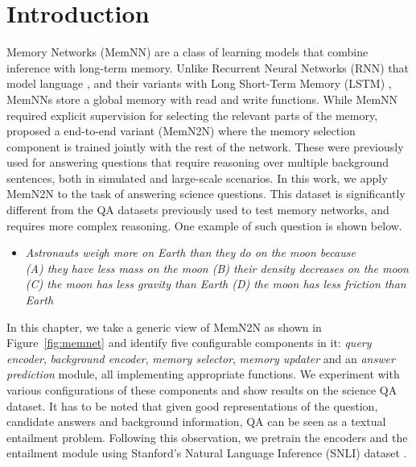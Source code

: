 \section{Introduction}
Memory Networks (MemNN) \citep{weston2014memory} are a class of learning models
that combine inference with long-term memory. Unlike Recurrent Neural Networks
(RNN) that model language \citep{mikolov2010recurrent}, and their variants with
Long Short-Term Memory (LSTM) \citep{hochreiter1997long}, MemNNs store a global
memory with read and write functions. While MemNN required explicit supervision
for selecting the relevant parts of the memory, \citep{sukhbaatar2015end}
proposed a end-to-end variant (MemN2N) where the memory selection component is
trained jointly with the rest of the network. These were previously used for
answering questions that require reasoning over multiple background sentences,
both in simulated \citep{bordes2010towards} and large-scale
\citep{fader2013paraphrase} scenarios. In this work, we apply MemN2N to the task
of answering science questions. This dataset is significantly different from the
QA datasets previously used to test memory networks, and requires more complex
reasoning. One example of such question is shown below.
\begin{itemize}
\item \textit{Astronauts weigh more on Earth than they do on the moon because \\
(A) they have less mass on the moon (B) their density decreases on the moon (C)
the moon has less gravity than Earth (D) the moon has less friction than Earth}
\end{itemize}
In this chapter, we take a generic view of MemN2N as shown in
Figure~\ref{fig:memnet} and identify five configurable components in it:
\textit{query encoder}, \textit{background encoder}, \textit{memory selector},
\textit{memory updater} and an \textit{answer prediction} module, all
implementing appropriate functions. We experiment with various configurations of
these components and show results on the science QA dataset. It has to be noted
that given good representations of the question, candidate answers and
background information, QA can be seen as a textual entailment problem.
Following this observation, we pretrain the encoders and the entailment module
using Stanford's Natural Language Inference (SNLI) dataset
\citep{bowman2015large}.

